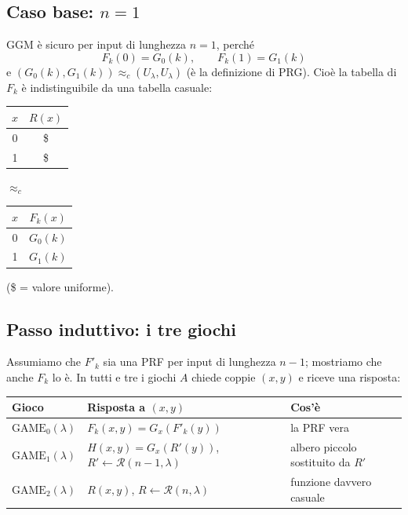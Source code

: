 \subsection{Caso base: \texorpdfstring{\(n = 1\)}{n = 1}}

GGM è sicuro per input di lunghezza \(n = 1\), perché
\[
F_k(0) = G_0(k), \qquad F_k(1) = G_1(k)
\]
e \((G_0(k), G_1(k)) \approx_c (U_\lambda, U_\lambda)\) (è la definizione di PRG). Cioè la tabella di \(F_k\) è indistinguibile da una tabella casuale:

\begin{center}
\begin{tabular}{cc}
\toprule
\(x\) & \(R(x)\) \\
\midrule
0 & \$ \\
1 & \$ \\
\bottomrule
\end{tabular}
\quad \(\approx_c\) \quad
\begin{tabular}{cc}
\toprule
\(x\) & \(F_k(x)\) \\
\midrule
0 & \(G_0(k)\) \\
1 & \(G_1(k)\) \\
\bottomrule
\end{tabular}
\end{center}
(\$ = valore uniforme).

\subsection{Passo induttivo: i tre giochi}

Assumiamo che \(F'_k\) sia una PRF per input di lunghezza \(n-1\); mostriamo che anche \(F_k\) lo è. In tutti e tre i giochi \(A\) chiede coppie \((x, y)\) e riceve una risposta:

\begin{center}
\begin{tabular}{lll}
\toprule
Gioco & Risposta a \((x, y)\) & Cos'è \\
\midrule
\(\text{GAME}_0(\lambda)\) & \(F_k(x, y) = G_x(F'_k(y))\) & la PRF vera \\
\(\text{GAME}_1(\lambda)\) & \(H(x, y) = G_x(R'(y))\), \(R' \leftarrow \mathcal{R}(n-1, \lambda)\) & albero piccolo sostituito da \(R'\) \\
\(\text{GAME}_2(\lambda)\) & \(R(x, y)\), \(R \leftarrow \mathcal{R}(n, \lambda)\) & funzione davvero casuale \\
\bottomrule
\end{tabular}
\end{center}

